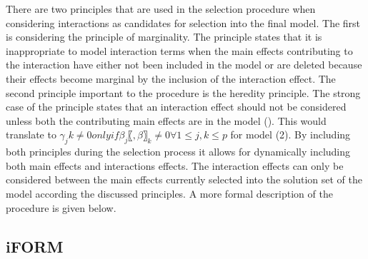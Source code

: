 \documentclass[]{book}
\theoremstyle{definition}
\theoremstyle{definition}
\theoremstyle{remark}
\begin{document}
There are two principles that are used in the selection procedure when
considering interactions as candidates for selection into the final
model. The first is considering the principle of marginality. The
principle states that it is inappropriate to model interaction terms
when the main effects contributing to the interaction have either not
been included in the model or are deleted because their effects become
marginal by the inclusion of the interaction effect. The second
principle important to the procedure is the heredity principle. The
strong case of the principle states that an interaction effect should
not be considered unless both the contributing main effects are in the
model (\cite{zhao2006model}). This would translate to
\(γ_jk≠0 only if β_j 〖,β〗_k≠0 ∀ 1≤j,k≤p\) for model (2). By including
both principles during the selection process it allows for dynamically
including both main effects and interactions effects. The interaction
effects can only be considered between the main effects currently
selected into the solution set of the model according the discussed
principles. A more formal description of the procedure is given below.

\subsection{iFORM}\label{iform}
\end{document}

